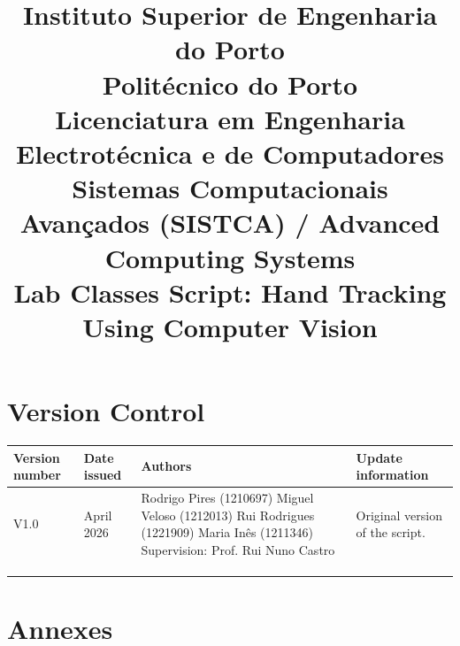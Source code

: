 \documentclass[11pt,a4paper]{article}
\title{
    \vspace{-2cm}
    \textbf{Instituto Superior de Engenharia do Porto} \\
    Politécnico do Porto \\
    \vspace{0.5cm}
    Licenciatura em Engenharia Electrotécnica e de Computadores \\
    Sistemas Computacionais Avançados (SISTCA) / Advanced Computing Systems \\
    \vspace{1cm}
    \Large{\textbf{Lab Classes Script: Hand Tracking Using Computer Vision}} \\
}
\author{}
\date{}
\begin{document}
\maketitle

\section*{Version Control}
\begin{center}
\renewcommand{\arraystretch}{1.5}
\begin{tabularx}{\textwidth}{|l|l|X|X|}
\hline
\textbf{Version number} & \textbf{Date issued} & \textbf{Authors} & \textbf{Update information} \\ \hline
V1.0 & April 2026 & Rodrigo Pires (1210697) \newline Miguel Veloso (1212013) \newline Rui Rodrigues (1221909) \newline Maria Inês (1211346) \vspace{0.3cm} \newline Supervision: \newline Prof. Rui Nuno Castro & Original version of the script. \\ \hline
 &  &  &  \\ \hline
 &  &  &  \\ \hline
 &  &  &  \\ \hline
\end{tabularx}
\end{center}

\newpage

\tableofcontents

\newpage












\newpage



\newpage
\section*{Annexes}
\end{document}
